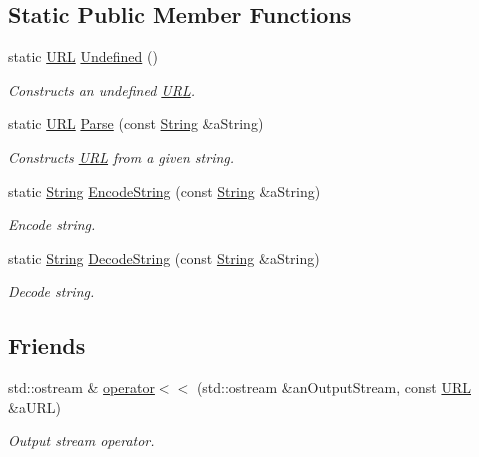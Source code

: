 \subsection*{Static Public Member Functions}
\begin{DoxyCompactItemize}
\item 
static \hyperlink{classlibrary_1_1io_1_1_u_r_l}{U\+RL} \hyperlink{classlibrary_1_1io_1_1_u_r_l_a10de2711247d54ec4dbaf317a0b2ab2c}{Undefined} ()
\begin{DoxyCompactList}\small\item\em Constructs an undefined \hyperlink{classlibrary_1_1io_1_1_u_r_l}{U\+RL}. \end{DoxyCompactList}\item 
static \hyperlink{classlibrary_1_1io_1_1_u_r_l}{U\+RL} \hyperlink{classlibrary_1_1io_1_1_u_r_l_a98cf42141cf75e1dd5362eb208a1e2bd}{Parse} (const \hyperlink{namespacelibrary_1_1io_a7469b45835a4421045db344d6a5a1f85}{String} \&a\+String)
\begin{DoxyCompactList}\small\item\em Constructs \hyperlink{classlibrary_1_1io_1_1_u_r_l}{U\+RL} from a given string. \end{DoxyCompactList}\item 
static \hyperlink{namespacelibrary_1_1io_a7469b45835a4421045db344d6a5a1f85}{String} \hyperlink{classlibrary_1_1io_1_1_u_r_l_a92ff8302358b5f42c08e5b879062730d}{Encode\+String} (const \hyperlink{namespacelibrary_1_1io_a7469b45835a4421045db344d6a5a1f85}{String} \&a\+String)
\begin{DoxyCompactList}\small\item\em Encode string. \end{DoxyCompactList}\item 
static \hyperlink{namespacelibrary_1_1io_a7469b45835a4421045db344d6a5a1f85}{String} \hyperlink{classlibrary_1_1io_1_1_u_r_l_a53663c78171412c2b3f6378911437720}{Decode\+String} (const \hyperlink{namespacelibrary_1_1io_a7469b45835a4421045db344d6a5a1f85}{String} \&a\+String)
\begin{DoxyCompactList}\small\item\em Decode string. \end{DoxyCompactList}\end{DoxyCompactItemize}
\subsection*{Friends}
\begin{DoxyCompactItemize}
\item 
std\+::ostream \& \hyperlink{classlibrary_1_1io_1_1_u_r_l_a98ed4737303253c4105846425180fc30}{operator$<$$<$} (std\+::ostream \&an\+Output\+Stream, const \hyperlink{classlibrary_1_1io_1_1_u_r_l}{U\+RL} \&a\+U\+RL)
\begin{DoxyCompactList}\small\item\em Output stream operator. \end{DoxyCompactList}\end{DoxyCompactItemize}


